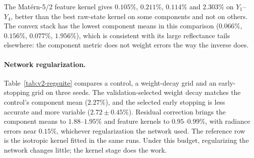 \begin{table}[p]
\centering

\caption{Ten input-space kernels, feature kernels and combination rules on the EMIT state
inputs, with rank-64 outputs. Entries are component mean relative spectral errors in percent,
averaged over seeds 101--103 with sample standard deviations. The network has width 512 and depth
3 with a 150-epoch budget. Kernels include the Mat\'ern family, Gaussian, spectral mixture
\cite{wilsonadams}, NNGP \cite{chosaul,leenngp}, NTK \cite{ntk}, additive kernel
\cite{additivegp}, and learned input scales \cite{owhadiyoo,rw}.}
\label{tab:v2-multikernel}
\end{table}

The Mat\'ern-5/2 feature kernel gives $0.105\%$, $0.211\%$, $0.114\%$ and $2.303\%$ on
$Y_1$--$Y_4$, better than the best raw-state kernel on some components and not on others. The
convex stack has the lowest component means in this comparison ($0.066\%$, $0.156\%$, $0.077\%$,
$1.956\%$), which is consistent with its large reflectance tails elsewhere: the component metric
does not weight errors the way the inverse does.

\paragraph{Network regularization.}
Table~\ref{tab:v2-regsuite} compares a control, a weight-decay grid and an early-stopping grid on
three seeds. The validation-selected weight decay matches the control's component mean
($2.27\%$), and the selected early stopping is less accurate and more variable
($2.72\pm0.45\%$). Residual correction brings the component means to $1.88$--$1.95\%$ and
feature kernels to $0.95$--$0.99\%$, with radiance errors near $0.15\%$, whichever
regularization the network used. The reference row is the isotropic kernel fitted in the same runs.
Under this budget, regularizing the network changes little; the kernel stage does the work.

\begin{table}[t]
\centering

\caption{Regularization comparison, seeds 101--103. Each cell gives the mean component
relative error [percent] / radiance relative error [percent], with sample standard deviations.
The width-512, depth-3 network has a 150-epoch cap, and validation selects among three runs per
arm. The weight-decay grid is $10^{-5},10^{-4},10^{-3}$ and the early-stopping patience grid 3, 5
and 10 epochs \cite{adamw,prechelt}. The reference row is the isotropic kernel fitted in the same
runs.}
\label{tab:v2-regsuite}
\end{table}

